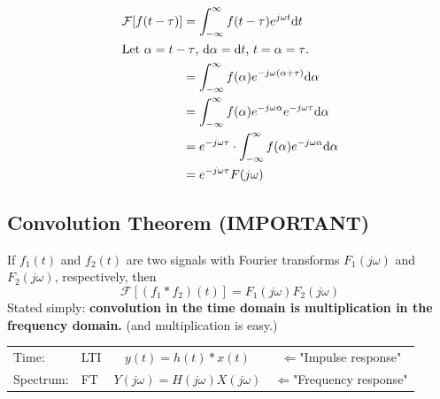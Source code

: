 \documentclass[10pt]{article}
\begin{document}
\begin{align*}
\mathcal{F}[f(t - \tau)] &= \int_{-\infty}^\infty f(t - \tau) e^{j\omega t} \text{d}t\\
\intertext{Let $\alpha = t - \tau$, $\text{d}\alpha = \text{d}t$, $t = \alpha = \tau$.}
&= \int_{-\infty}^\infty f(\alpha) e^{-j\omega(\alpha + \tau)} \text{d}\alpha\\
&= \int_{-\infty}^\infty f(\alpha) e^{-j\omega \alpha} e^{-j\omega \tau} \text{d}\alpha\\
&= e^{-j\omega \tau} \cdot \int_{-\infty}^\infty f(\alpha) e^{-j\omega \alpha} \text{d}\alpha\\
&= e^{-j\omega \tau} F(j\omega)
\end{align*}


\subsection*{Convolution Theorem (IMPORTANT)}
If $f_1(t)$ and $f_2(t)$ are two signals with Fourier transforms $F_1(j\omega)$ and $F_2(j\omega)$, respectively, then
\[\boxed{\mathcal{F}[(f_1 * f_2)(t)] = F_1(j\omega) F_2(j\omega)}\]
Stated simply: \textbf{convolution in the time domain is multiplication in the frequency domain.}  (and multiplication is easy.)\\

\begin{tabular}{llcc}
    Time: & LTI & $y(t) = h(t) * x(t)$ & $\Leftarrow$"Impulse response"\\
    Spectrum: & FT & \hspace{0.1cm}$Y(j\omega) = H(j\omega) X(j\omega)$ & $\Leftarrow$"Frequency response"
\end{tabular}
\end{document}
